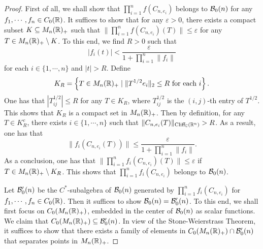 \documentclass[11pt]{article}
\theoremstyle{definition}
\theoremstyle{plain}
\def\Cl{\textup{Cliff}_{\IC}}
\begin{document}
\begin{proof}
First of all, we shall show that $\prod_{i=1}^{n}f(C_{n,e_i})$ belongs to $\mathcal B_0(n)$ for any $f_1,\cdots,f_n\in C_0(\mathbb R)$. It suffices to show that for any $\varepsilon>0$, there exists a compact subset $K\subseteq M_n(\mathbb R)_+$ such that $\|\prod_{i=1}^{n}f(C_{n,e_i})(T)\|\leq\varepsilon$ for any $T\in M_n(\mathbb R)_+ \setminus K$. To this end, we find $R>0$ such that
$$|f_i(t)|<\frac{\varepsilon}{1+\prod_{i=1}^{n}\|f_i\|}$$
for each $i\in\{1,\cdots,n\}$ and $|t|>R$. Define
$$K_R=\left\{T\in M_n(\mathbb R)_+\mid \|T^{1/2}e_i\|_2\leq R\text{ for each }i\right\}.$$
One has that $|T^{1/2}_{ij}|\leq R$ for any $T\in K_R$, where $T^{1/2}_{ij}$ is the $(i,j)$-th entry of $T^{1/2}$. This shows that $K_R$ is a compact set in $M_n(\mathbb R)_+$. Then by definition, for any $T\in K_R^c$, there exists $i\in\{1,\cdots,n\}$ such that $\|C_{n,e_i}(T)\|_{\Cl(\IR^n)}>R$. As a result, one has that
$$\|f_i(C_{n,e_i}(T))\|\leq \frac{\varepsilon}{1+\prod_{i=1}^{n}\|f_i\|}.$$
As a conclusion, one has that $\|\prod_{i=1}^n f_i(C_{n,e_i})(T)\|\leq\varepsilon$ if $T\in M_n(\mathbb R)_+ \setminus K_R$. This shows that $\prod_{i=1}^n f_i(C_{n,e_i})$ belongs to $\mathcal B_0(n)$.

Let $\mathcal B'_0(n)$ be the $C^*$-subalgebra of $\mathcal B_0(n)$ generated by $\prod_{i=1}^{n} f_i(C_{n, e_i})$ for $f_1,\cdots,f_n\in C_0(\mathbb R)$. Then it suffices to show $\mathcal B_0(n)=\mathcal B'_0(n)$. To this end, we shall first focus on $C_0(M_n(\mathbb R)_+)$, embedded in the center of $\mathcal B_0(n)$ as scalar functions. We claim that $C_0(M_n(\mathbb R)_+)\subseteq\mathcal B'_0(n)$. In view of the Stone-Weierstrass Theorem, it suffices to show that there exists a family of elements in $C_0(M_n(\mathbb R)_+)\cap \mathcal B'_0(n)$ that separates points in $M_n(\mathbb R)_+$.


\end{proof}
\end{document}
